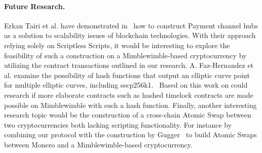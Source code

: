 \paragraph{Future Research.} Erkan Tairi et al. have demonstrated in~\cite{tairi2019a2l} how to construct Payment channel hubs as a solution to scalability issues of blockchain technologies.
With their approach relying solely on Scriptless Scripts, it would be interesting to explore the feasibility of such a construction on a Mimblewimble-based cryptocurrency by utilizing the contract transactions outlined in our research.
A. Faz-Hernandez et al. examine the possibility of hash functions that output an elliptic curve point for multiple elliptic curves, including secp256k1.~\cite{hernandez2020hashing} Based on this work on could research if more elaborate contracts such as hashed timelock contracts are made possible on Mimblewimble with such a hash function.
Finally, another interesting research topic would be the construction of a cross-chain Atomic Swap between two cryptocurrencies both lacking scripting functionality.
For instance by combining our protocol with the construction by Gugger~\cite{gugger2020bitcoin} to build Atomic Swaps between Monero and a Mimblewimble-based cryptocurrency.


